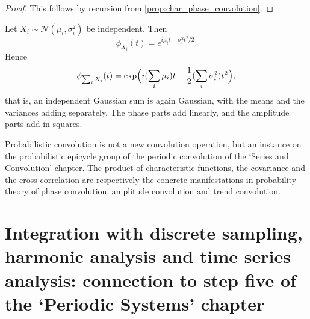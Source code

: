 \begin{proof}
This follows by recursion from \cref{prop:char_phase_convolution}.
\end{proof}

\begin{example}\label{ex:gaussian_sum}
Let $X_i\sim\mathcal N(\mu_i,\sigma_i^2)$ be independent. Then
\[
\phi_{X_i}(t)=e^{i\mu_it-\sigma_i^2t^2/2}.
\]
Hence
\[
\phi_{\sum_iX_i}(t)=\exp\Bigl(i(\sum_i\mu_i)t-\frac12(\sum_i\sigma_i^2)t^2\Bigr),
\]
that is, an independent Gaussian sum is again Gaussian, with the means and the variances adding separately. The phase parts add linearly, and the amplitude parts add in squares.
\end{example}

\begin{remark}\label{rem:prob_convolution_relation}
Probabilistic convolution is not a new convolution operation, but an instance on the probabilistic epicycle group of the periodic convolution of the `Series and Convolution' chapter. The product of characteristic functions, the covariance and the cross-correlation are respectively the concrete manifestations in probability theory of phase convolution, amplitude convolution and trend convolution.
\end{remark}

\section{Integration with discrete sampling, harmonic analysis and time series analysis: connection to step five of the `Periodic Systems' chapter}
\label{sec:prob_integration}

